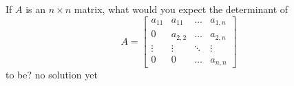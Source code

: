 {
If $A$ is an $n\times n$ matrix, what would you expect the determinant of 
\[A =
\begin{bmatrix}
	a_{11} & 	a_{11} & \dots & a_{1, n} \\
0	& a_{2,2} & \dots & a_{2,n} \\
\vdots & \vdots  &\ddots & \vdots \\
0 & 0 & \dots &a_{n,n}
\end{bmatrix}
	\]
to be?
}
{
no solution yet
}
